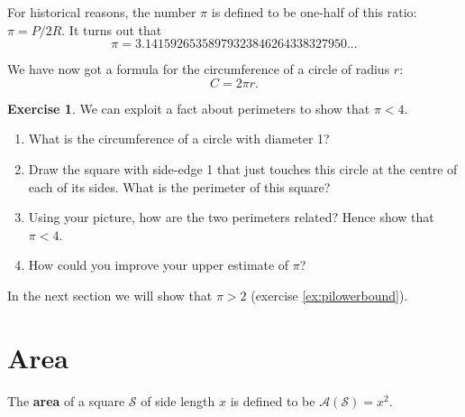 \documentclass[a4paper]{report}
\theoremstyle{definition}
\newtheorem{exercise}[thm]{Exercise}
\newcommand{\df}[1]{\textbf{#1}\index{#1}}
\begin{document}
  For historical reasons, the number $ \pi $ is defined to be one-half of this ratio: $ \pi = P/2R $. It
  turns out that
  \begin{equation}
    \pi = 3.14159265358979323846264338327950...
  \end{equation}

  We have now got a formula for the circumference of a circle of radius $ r $:
  \begin{equation}
    C = 2\pi r.
  \end{equation}

  \begin{exercise}\label{ex:piupperbound}
    We can exploit a fact about perimeters to show that $ \pi < 4 $.
    \begin{enumerate}
      \item What is the circumference of a circle with diameter 1?
      \item Draw the square with side-edge 1 that just touches this circle at the centre of each
            of its sides. What is the perimeter of this square?
      \item Using your picture, how are the two perimeters related? Hence show that $ \pi < 4 $.
      \item How could you improve your upper estimate of $ \pi $?
    \end{enumerate}
    In the next section we will show that $ \pi > 2 $ (exercise \ref{ex:pilowerbound}).
  \end{exercise}

  \section{Area}
  The \df{area} of a square $ \mathscr{S} $ of side length $ x $ is defined to be $ \mathcal{A}(\mathscr{S}) = x^2 $.
\end{document}
